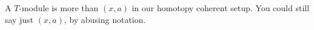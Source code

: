 A $ T $-module is more than $ (x, a) $ in our homotopy coherent setup.
You could still say just $ (x, a) $, by abusing notation.
